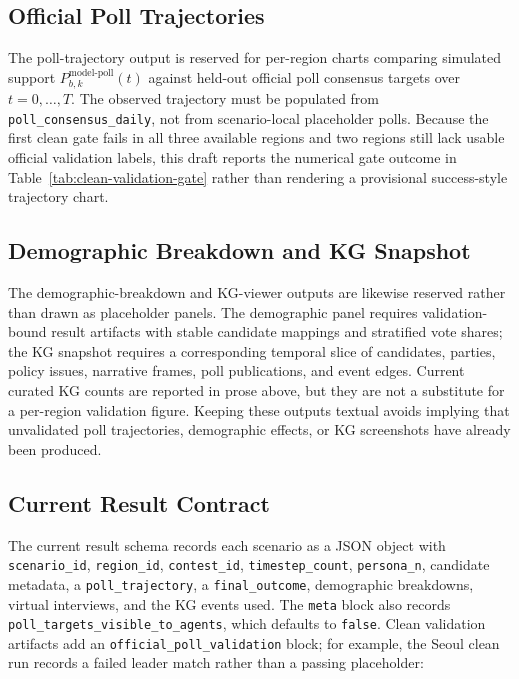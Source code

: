 \documentclass[11pt]{article}
\begin{document}
\subsection{Official Poll Trajectories}

The poll-trajectory output is reserved for per-region charts comparing simulated support $P^{\text{model-poll}}_{b,k}(t)$ against held-out official poll consensus targets over $t = 0, \dots, T$. The observed trajectory must be populated from \texttt{poll\_consensus\_daily}, not from scenario-local placeholder polls. Because the first clean gate fails in all three available regions and two regions still lack usable official validation labels, this draft reports the numerical gate outcome in Table~\ref{tab:clean-validation-gate} rather than rendering a provisional success-style trajectory chart.

\subsection{Demographic Breakdown and KG Snapshot}

The demographic-breakdown and KG-viewer outputs are likewise reserved rather than drawn as placeholder panels. The demographic panel requires validation-bound result artifacts with stable candidate mappings and stratified vote shares; the KG snapshot requires a corresponding temporal slice of candidates, parties, policy issues, narrative frames, poll publications, and event edges. Current curated KG counts are reported in prose above, but they are not a substitute for a per-region validation figure. Keeping these outputs textual avoids implying that unvalidated poll trajectories, demographic effects, or KG screenshots have already been produced.

\subsection{Current Result Contract}

The current result schema records each scenario as a JSON object with \texttt{scenario\_id}, \texttt{region\_id}, \texttt{contest\_id}, \texttt{timestep\_count}, \texttt{persona\_n}, candidate metadata, a \texttt{poll\_trajectory}, a \texttt{final\_outcome}, demographic breakdowns, virtual interviews, and the KG events used. The \texttt{meta} block also records \texttt{poll\_targets\_visible\_to\_agents}, which defaults to \texttt{false}. Clean validation artifacts add an \texttt{official\_poll\_validation} block; for example, the Seoul clean run records a failed leader match rather than a passing placeholder:
\end{document}
